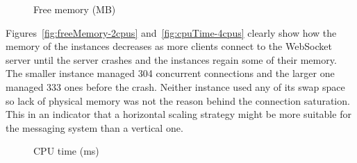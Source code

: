 \begin{figure}[h!]
	\centering
	 \hfill
	\caption{Free memory (MB)}
	\label{fig:freeMemory}
\end{figure}

\noindent
Figures~\ref{fig:freeMemory-2cpus} and~\ref{fig:cpuTime-4cpus} clearly show how the memory of the instances decreases as more clients connect to the WebSocket server until the server crashes and the instances regain some of their memory. The smaller instance managed 304 concurrent connections and the larger one managed 333 ones before the crash. Neither instance used any of its swap space so lack of physical memory was not the reason behind the connection saturation. This in an indicator that a horizontal scaling strategy might be more suitable for the messaging system than a vertical one.
\\
\begin{figure}[h!]
	\centering
	 \hfill
	\caption{CPU time  (ms)}
\end{figure}

